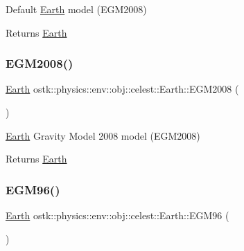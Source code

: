 Default \hyperlink{classostk_1_1physics_1_1env_1_1obj_1_1celest_1_1_earth}{Earth} model (E\+G\+M2008) 

\begin{DoxyReturn}{Returns}
\hyperlink{classostk_1_1physics_1_1env_1_1obj_1_1celest_1_1_earth}{Earth} 
\end{DoxyReturn}
\mbox{\label{classostk_1_1physics_1_1env_1_1obj_1_1celest_1_1_earth_a69213489a7ce28c3dfa990283657b2bf}} 
\subsubsection{\texorpdfstring{E\+G\+M2008()}{EGM2008()}}
{\footnotesize\ttfamily \hyperlink{classostk_1_1physics_1_1env_1_1obj_1_1celest_1_1_earth}{Earth} ostk\+::physics\+::env\+::obj\+::celest\+::\+Earth\+::\+E\+G\+M2008 (\begin{DoxyParamCaption}{ }\end{DoxyParamCaption})\hspace{0.3cm}{\ttfamily [static]}}



\hyperlink{classostk_1_1physics_1_1env_1_1obj_1_1celest_1_1_earth}{Earth} Gravity Model 2008 model (E\+G\+M2008) 

\begin{DoxyReturn}{Returns}
\hyperlink{classostk_1_1physics_1_1env_1_1obj_1_1celest_1_1_earth}{Earth} 
\end{DoxyReturn}
\mbox{\label{classostk_1_1physics_1_1env_1_1obj_1_1celest_1_1_earth_ae86930600e872b2af40da227454fe49f}} 
\subsubsection{\texorpdfstring{E\+G\+M96()}{EGM96()}}
{\footnotesize\ttfamily \hyperlink{classostk_1_1physics_1_1env_1_1obj_1_1celest_1_1_earth}{Earth} ostk\+::physics\+::env\+::obj\+::celest\+::\+Earth\+::\+E\+G\+M96 (\begin{DoxyParamCaption}{ }\end{DoxyParamCaption})\hspace{0.3cm}{\ttfamily [static]}}



